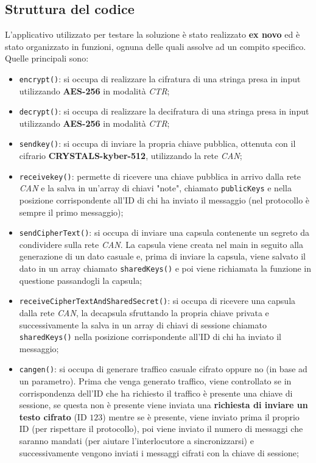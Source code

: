 \subsection{Struttura del codice}
L'applicativo utilizzato per testare la soluzione è stato realizzato \textbf{ex novo} ed è stato organizzato in funzioni, ognuna delle quali assolve ad un compito specifico. Quelle principali sono:
\begin{itemize}
    \item \texttt{encrypt()}: si occupa di realizzare la cifratura di una stringa presa in input utilizzando \textbf{AES-256} in modalità \emph{CTR};
    \item \texttt{decrypt()}: si occupa di realizzare la decifratura di una stringa presa in input utilizzando \textbf{AES-256} in modalità \emph{CTR}; 
    \item \texttt{sendkey()}: si occupa di inviare la propria chiave pubblica, ottenuta con il cifrario \textbf{CRYSTALS-kyber-512}, utilizzando la rete \emph{CAN};
    \item \texttt{receivekey()}: permette di ricevere una chiave pubblica in arrivo dalla rete \emph{CAN} e la salva in un'array di chiavi "note", chiamato \texttt{publicKeys} e nella posizione corrispondente all'ID di chi ha inviato il messaggio (nel protocollo è sempre il primo messaggio);
    \item \texttt{sendCipherText()}: si occupa di inviare una capsula contenente un segreto da condividere sulla rete \emph{CAN}. La capsula viene creata nel main in seguito alla generazione di un dato casuale e, prima di inviare la capsula, viene salvato il dato in un array chiamato \texttt{sharedKeys()} e poi viene richiamata la funzione in questione passandogli la capsula;
    \item \texttt{receiveCipherTextAndSharedSecret()}: si occupa di ricevere una capsula dalla rete \emph{CAN}, la decapsula sfruttando la propria chiave privata e successivamente la salva in un array di chiavi di sessione chiamato \texttt{sharedKeys()} nella posizione corrispondente all'ID di chi ha inviato il messaggio;
    \item \texttt{cangen()}: si occupa di generare traffico casuale cifrato oppure no (in base ad un parametro). Prima che venga generato traffico, viene controllato se in corrispondenza dell'ID che ha richiesto il traffico è presente una chiave di sessione, se questa non è presente viene inviata una \textbf{richiesta di inviare un testo cifrato} (ID $123$) mentre se è presente, viene inviato prima il proprio ID (per rispettare il protocollo), poi viene inviato il numero di messaggi che saranno mandati (per aiutare l'interlocutore a sincronizzarsi) e successivamente vengono inviati i messaggi cifrati con la chiave di sessione;

\end{itemize}
